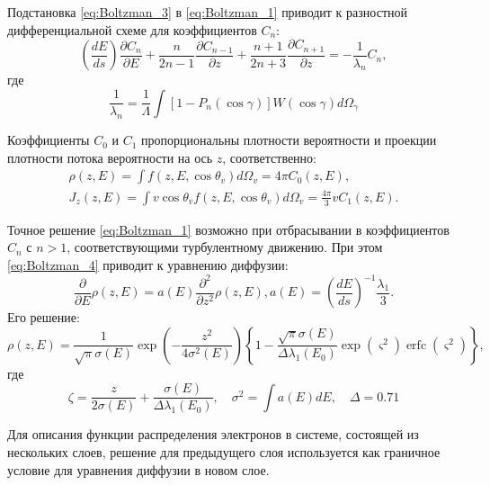 Подстановка \ref{eq:Boltzman_3} в \ref{eq:Boltzman_1} приводит к разностной дифференциальной схеме для коэффициентов $C_n$:
\begin{equation} \label{eq:Boltzman_4}
	\left(\frac{d E}{d s}\right) \frac{\partial C_n}{\partial E}+\frac{n}{2 n-1} \frac{\partial C_{n-1}}{\partial z}+\frac{n+1}{2 n+3} \frac{\partial C_{n+1}}{\partial z}=-\frac{1}{\lambda_n} C_n,
\end{equation}
где
\begin{equation} \label{eq:Boltzman_5}
	\frac{1}{\lambda_n}=\frac{1}{\Lambda} \int\left[1-P_n(\cos \gamma)\right] W(\cos \gamma) d \Omega_\gamma
\end{equation}

Коэффициенты $C_0$ и $C_1$ пропорциональны плотности вероятности и проекции плотности потока вероятности на ось $z$, соответственно:
\begin{equation} \label{eq:Boltzman_6}
	\begin{gathered}
		\rho(z, E)=\int f\left(z, E, \cos \theta_v\right) d \Omega_v=4 \pi C_0(z, E), \\
		J_z(z, E)=\int v \cos \theta_v f\left(z, E, \cos \theta_v\right) d \Omega_v=\frac{4 \pi}{3} v C_1(z, E).
	\end{gathered}
\end{equation}

Точное решение \ref{eq:Boltzman_1} возможно при отбрасывании в  коэффициентов $C_n$ с \break $n>1$, соответствующими турбулентному движению. При этом \ref{eq:Boltzman_4} приводит к уравнению диффузии:
\begin{equation} \label{eq:Boltzman_7}
	\frac{\partial}{\partial E} \rho(z, E)=a(E) \frac{\partial^2}{\partial z^2} \rho(z, E), a(E)=\left(\frac{d E}{d s}\right)^{-1} \frac{\lambda_1}{3} .
\end{equation}
Его решение:
\begin{equation} \label{eq:Boltzman_8}
	\rho(z, E)=\frac{1}{\sqrt{\pi} \sigma(E)} \exp \left(-\frac{z^2}{4 \sigma^2(E)}\right)\left\{1-\frac{\sqrt{\pi} \sigma(E)}{\Delta \lambda_1\left(E_0\right)} \exp \left(\varsigma^2\right) \operatorname{erfc}\left(\varsigma^2\right)\right\},
\end{equation}
где
\begin{equation} \label{eq:Boltzman_9}
	\zeta=\frac{z}{2 \sigma(E)}+\frac{\sigma(E)}{\Delta \lambda_1\left(E_0\right)}, \quad \sigma^2=\int a(E) d E, \quad \Delta=0.71
\end{equation}

Для описания функции распределения электронов в системе, состоящей из нескольких слоев, решение для предыдущего слоя используется как граничное условие для уравнения диффузии в новом слое.


